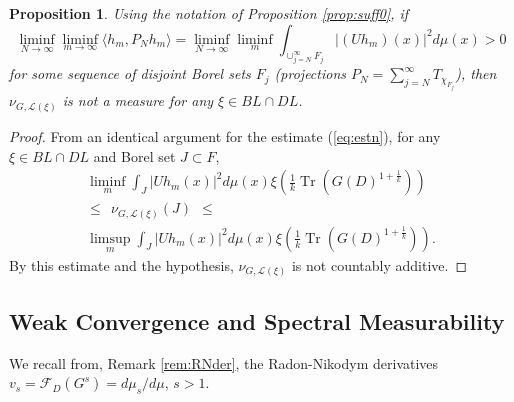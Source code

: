 \documentclass[final,1p]{elsarticle}
\numberwithin{equation}{section}
\theoremstyle{plain}
\newtheorem{prop}[thm]{Proposition}
\theoremstyle{definition}
\newcounter{prop2count}
\begin{document}
\begin{prop} \label{prop:suff} \label{lemma:Ubnd}
Using the notation of Proposition \ref{prop:suff0},
if
\begin{equation*}
\liminf_{N \to \infty} \liminf_{m \to \infty} {\ensuremath{\langle {h_m} , {P_Nh_m} \rangle}} = \liminf_{N \to \infty} \liminf_m \int_{\cup_{j=N}^\infty F_j} |(Uh_m)(x)|^2 d\mu(x)
> 0
\end{equation*}
for some sequence of disjoint Borel sets $F_j$ (projections $P_N =
\sum_{j = N}^\infty T_{\chi_{F_j}}$), then $\nu_{G,\mathcal{L}({\ensuremath{\xi}})}$
is not a measure for any ${\ensuremath{\xi}} \in BL \cap DL$.
\end{prop}
\begin{proof}
From an identical argument for the estimate (\ref{eq:estn}), for any ${\ensuremath{\xi}} \in BL \cap DL$ and Borel set $J \subset F$,
\begin{multline*}
\liminf_m \int_J |Uh_m(x)|^2d\mu(x) {\ensuremath{\xi}} \left( \frac 1k \operatorname{Tr}(G(D)^{1 + \frac 1k}) \right) \\
\leq \ \   \nu_{G,\mathcal{L}({\ensuremath{\xi}})}(J)  \ \ \leq  \ \ \ \ \ \ \ \ \ \ \ \ \ \ \ \ \ \ \\
 \limsup_m \int_J |Uh_m(x)|^2d\mu(x)
{\ensuremath{\xi}} \left( \frac 1k \operatorname{Tr}(G(D)^{1 + \frac 1k}) \right) .
\end{multline*}
By this estimate and the hypothesis, $\nu_{G,\mathcal{L}({\ensuremath{\xi}})}$ is not countably additive.
\end{proof}

\subsection{Weak Convergence and Spectral Measurability} \label{sec:3.3} \label{sec:3.2}

\medskip We recall from, Remark \ref{rem:RNder}, the Radon-Nikodym derivatives
$v_s = \mathcal{F}_D(G^s) = d\mu_s / d\mu$, $s > 1$.
\end{document}
